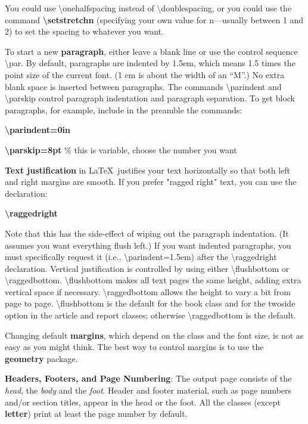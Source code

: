 \documentclass[12pt,openright]{book}
\begin{document}
You could use \textbackslash onehalfspacing instead of \textbackslash doublespacing, or you could use the command \textbf{\textbackslash setstretch{n}} (specifying your own value for n—usually between 1 and 2) to set the spacing to whatever you want.

To start a new \textbf{paragraph}, either leave a blank line or use the control sequence \textbackslash par. By default, paragraphs are indented by 1.5em, which means 1.5 times the point size of the current font. (1 em is about the width of an “M”.) No extra blank space is inserted between paragraphs. The commands \textbackslash parindent and \textbackslash parskip control paragraph indentation and paragraph separation. To get block paragraphs, for example, include in the preamble the commands: 

\textbf{\textbackslash parindent=0in} 

\textbf{\textbackslash parskip=8pt} \% this is variable, choose the number you want

\textbf{Text justification} in \LaTeX\ justifies your text horizontally so that both left and right margins are smooth. If you prefer "ragged right" text, you can use the declaration:

\textbf{\textbackslash raggedright}

Note that this has the side-effect of wiping out the paragraph indentation. (It assumes you want everything flush left.) If you want indented paragraphs, you must specifically request it (i.e., \textbackslash parindent=1.5em) after the \textbackslash raggedright declaration. Vertical justification is controlled by using either \textbackslash flushbottom or \textbackslash raggedbottom. \textbackslash flushbottom makes all text pages the same height, adding extra vertical space if necessary. \textbackslash raggedbottom allows the height to vary a bit from page to page. \textbackslash flushbottom is the default for the book class and for the twoside option in the article and report classes; otherwise \textbackslash raggedbottom is the default.

Changing default \textbf{margins}, which depend on the class and the font size, is not as easy as you might think. The best way to control margins is to use the \textbf{geometry} package.

\textbf{Headers, Footers, and Page Numbering}: The output page consists of the \textit{head}, the \textit{body} and the \textit{foot}. Header and footer material, such as page numbers and/or section titles, appear in the head or the foot. All the classes (except \textbf{letter}) print at least the page number by default.
\end{document}
